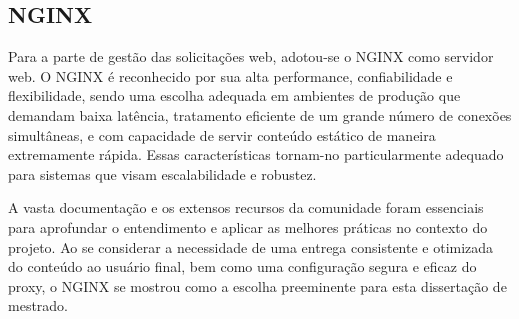 \subsection{NGINX}
Para a parte de gestão das solicitações web, adotou-se o NGINX \cite{nginxDocs} como servidor web. O NGINX é reconhecido por sua alta performance, confiabilidade e flexibilidade, sendo uma escolha adequada em ambientes de produção que demandam baixa latência, tratamento eficiente de um grande número de conexões simultâneas, e com capacidade de servir conteúdo estático de maneira extremamente rápida. Essas características tornam-no particularmente adequado para sistemas que visam escalabilidade e robustez. 

A vasta documentação e os extensos recursos da comunidade foram essenciais para aprofundar o entendimento e aplicar as melhores práticas no contexto do projeto. Ao se considerar a necessidade de uma entrega consistente e otimizada do conteúdo ao usuário final, bem como uma configuração segura e eficaz do proxy, o NGINX se mostrou como a escolha preeminente para esta dissertação de mestrado.
